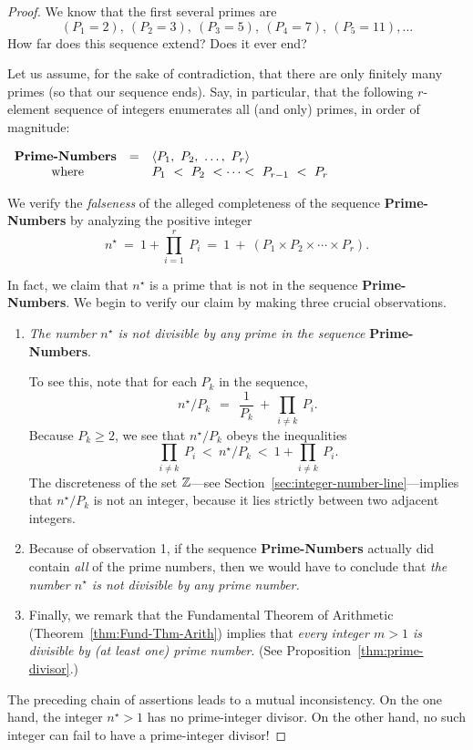 \begin{proof}
We know that the first several primes are
\[ (P_1 =2), \ (P_2 = 3), \ (P_3 =5), \ (P_4 = 7), \ (P_5 =11), \ldots \] 
How far does this sequence extend?  Does it ever end?

\medskip

Let us assume, for the sake of contradiction, that there are only finitely many primes (so that our sequence ends).  Say, in particular, that the following $r$-element sequence of integers enumerates all (and only) primes, in order of magnitude:

\medskip

$ \begin{array}{ccl}
\mbox{\bf Prime-Numbers} & = & 
\langle P_1, \ P_2, \ \ldots, \ P_r \rangle \\
\mbox{ where} &  &
P_1 \ < \ P_2 \ < \cdots < \ P_{r-1} \ < \ P_r
\end{array}
$

\medskip

We verify the {\em falseness} of the alleged completeness of the sequence {\bf Prime-Numbers} by analyzing the positive integer
\[ n^\star \ = \ 1 + \prod_{i=1}^r \ P_i \ = \ 
1 \ + \ \left(P_1 \times P_2 \times \cdots \times P_r \right).
\]

In fact, we claim that $n^\star$ is a prime that is not in the sequence {\bf Prime-Numbers}.  We begin to verify our claim by making three crucial observations.
\begin{enumerate}
\item
{\em The number $n^\star$ is not divisible by any prime in the sequence} {\bf Prime-Numbers}.

\smallskip

To see this, note that for each $P_k$ in the sequence,
\[
n^\star / P_k \ \ = \ \ \frac{1}{P_k} \ + \ \prod_{i \neq k} \ P_i .
\]
Because $P_k \geq 2$, we see that $n^\star / P_k$ obeys the inequalities
\[
\prod_{i \neq k} \ P_i \ < \ n^\star /P_k \ < \ 1 + \prod_{i \neq k} \ P_i.
\] 
The discreteness of the set $\mathbb{Z}$---see Section~\ref{sec:integer-number-line}---implies that $n^\star / P_k$ is not an integer, because it lies strictly between two adjacent integers.

\item
Because of observation 1, if the sequence {\bf Prime-Numbers} actually did contain {\em all} of the prime numbers, then we would have to conclude that {\em the number $n^\star$ is not divisible by any prime number.}

\item
Finally, we remark that the Fundamental Theorem of Arithmetic (Theorem~\ref{thm:Fund-Thm-Arith}) implies that {\em every integer $m >1$ is divisible by (at least one) prime number}.  (See Proposition~\ref{thm:prime-divisor}.)
\end{enumerate}
The preceding chain of assertions leads to a mutual inconsistency.  On the one hand, the integer $n^\star >1$ has no prime-integer divisor. On the other hand, no such integer can fail to have a prime-integer divisor!


\end{proof}
